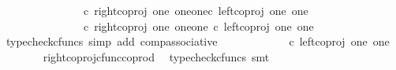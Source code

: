 \begin{isabellebody}
\ \ \isamarkupfalse%
{\isacharminus}{\kern0pt}\ \isanewline
\ \ \ \ \isamarkupfalse%
\ {\isachardoublequoteopen}{\isasymlangle}{\isasymt}{\isacharcomma}{\kern0pt}{\isasymt}{\isasymrangle}\ {\isasymamalg}\ {\isasymlangle}{\isasymt}{\isacharcomma}{\kern0pt}{\isasymf}{\isasymrangle}\ {\isasymamalg}\ {\isasymlangle}{\isasymf}{\isacharcomma}{\kern0pt}{\isasymt}{\isasymrangle}\ {\isasymcirc}\isactrlsub c\ {\isacharparenleft}{\kern0pt}right{\isacharunderscore}{\kern0pt}coproj\ one\ {\isacharparenleft}{\kern0pt}one{\isasymCoprod}one{\isacharparenright}{\kern0pt}{\isasymcirc}\isactrlsub c\ left{\isacharunderscore}{\kern0pt}coproj\ one\ one{\isacharparenright}{\kern0pt}\ {\isacharequal}{\kern0pt}\ \isanewline
\ \ \ \ \ \ \ \ \ \ {\isacharparenleft}{\kern0pt}{\isasymlangle}{\isasymt}{\isacharcomma}{\kern0pt}{\isasymt}{\isasymrangle}\ {\isasymamalg}\ {\isasymlangle}{\isasymt}{\isacharcomma}{\kern0pt}{\isasymf}{\isasymrangle}\ {\isasymamalg}\ {\isasymlangle}{\isasymf}{\isacharcomma}{\kern0pt}{\isasymt}{\isasymrangle}\ {\isasymcirc}\isactrlsub c\ right{\isacharunderscore}{\kern0pt}coproj\ one\ {\isacharparenleft}{\kern0pt}one{\isasymCoprod}one{\isacharparenright}{\kern0pt}\ {\isacharparenright}{\kern0pt}{\isasymcirc}\isactrlsub c\ left{\isacharunderscore}{\kern0pt}coproj\ one\ one{\isachardoublequoteclose}\isanewline
\ \ \ \ \ \ \isamarkupfalse%
\ {\isacharparenleft}{\kern0pt}typecheck{\isacharunderscore}{\kern0pt}cfuncs{\isacharcomma}{\kern0pt}\ simp\ add{\isacharcolon}{\kern0pt}\ comp{\isacharunderscore}{\kern0pt}associative{}{\isacharparenright}{\kern0pt}\isanewline
\ \ \ \ \isamarkupfalse%
\ \isamarkupfalse%
\ {\isachardoublequoteopen}{\isachardot}{\kern0pt}{\isachardot}{\kern0pt}{\isachardot}{\kern0pt}\ {\isacharequal}{\kern0pt}\ {\isasymlangle}{\isasymt}{\isacharcomma}{\kern0pt}{\isasymf}{\isasymrangle}\ {\isasymamalg}\ {\isasymlangle}{\isasymf}{\isacharcomma}{\kern0pt}{\isasymt}{\isasymrangle}\ {\isasymcirc}\isactrlsub c\ left{\isacharunderscore}{\kern0pt}coproj\ one\ one{\isachardoublequoteclose}\isanewline
\ \ \ \ \ \ \isamarkupfalse%
\ right{\isacharunderscore}{\kern0pt}coproj{\isacharunderscore}{\kern0pt}cfunc{\isacharunderscore}{\kern0pt}coprod\ \isamarkupfalse%
\ {\isacharparenleft}{\kern0pt}typecheck{\isacharunderscore}{\kern0pt}cfuncs{\isacharcomma}{\kern0pt}\ smt{\isacharparenright}{\kern0pt}\isanewline
\ \ \ \ \isamarkupfalse%
\ \isamarkupfalse%
\ {\isachardoublequoteopen}{\isachardot}{\kern0pt}{\isachardot}{\kern0pt}{\isachardot}{\kern0pt}\ {\isacharequal}{\kern0pt}\ {\isasymlangle}{\isasymt}{\isacharcomma}{\kern0pt}{\isasymf}{\isasymrangle}{\isachardoublequoteclose}\isanewline

\end{isabellebody}
